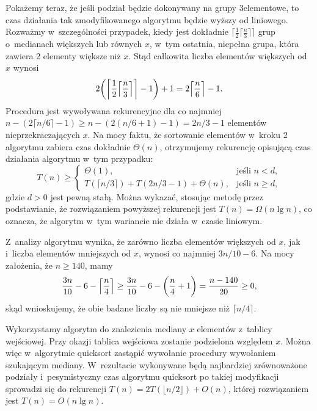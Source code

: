 Pokażemy teraz, że jeśli podział będzie dokonywany na grupy 3\nbhyphen elementowe, to czas działania tak zmodyfikowanego algorytmu  będzie wyższy od liniowego.
Rozważmy w~szczególności przypadek, kiedy jest dokładnie $\bigl\lceil\frac{1}{2}\bigl\lceil\frac{n}{3}\bigr\rceil\bigr\rceil$ grup o~medianach większych lub równych $x$, w~tym ostatnia, niepełna grupa, która zawiera 2 elementy większe niż $x$.
Stąd całkowita liczba elementów większych od $x$ wynosi
\[
	2\biggl(\biggl\lceil\frac{1}{2}\Bigl\lceil\frac{n}{3}\Bigr\rceil\biggr\rceil-1\biggr)+1 = 2\Bigl\lceil\frac{n}{6}\Bigr\rceil-1.
\]
Procedura jest wywoływana rekurencyjne dla co najmniej $n-(2\lceil n/6\rceil-1)\ge n-(2(n/6+1)-1)=2n/3-1$ elementów nieprzekraczających $x$.
Na mocy faktu, że sortowanie elementów w~kroku 2 algorytmu  zabiera czas dokładnie $\Theta(n)$, otrzymujemy rekurencję opisującą czas działania algorytmu w~tym przypadku:
\[
	T(n) \ge \begin{cases}
		\Theta(1), & \text{jeśli $n<d$}, \\
		T(\lceil n/3\rceil)+T(2n/3-1)+\Theta(n), & \text{jeśli $n\ge d$},
	\end{cases}
\]
gdzie $d>0$ jest pewną stałą.
Można wykazać, stosując metodę przez podstawianie, że rozwiązaniem powyższej rekurencji jest $T(n)=\Omega(n\lg n)$, co oznacza, że algorytm w~tym wariancie nie działa w~czasie liniowym.

\exercise %
Z~analizy algorytmu  wynika, że zarówno liczba elementów większych od $x$, jak i~liczba elementów mniejszych od $x$, wynosi co najmniej $3n/10-6$.
Na mocy założenia, że $n\ge140$, mamy
\[
	\frac{3n}{10}-6-\Bigl\lceil\frac{n}{4}\Bigr\rceil \ge \frac{3n}{10}-6-\biggl(\frac{n}{4}+1\biggr) = \frac{n-140}{20} \ge 0,
\]
skąd wnioskujemy, że obie badane liczby są nie mniejsze niż $\lceil n/4\rceil$.

\exercise %

\noindent Wykorzystamy algorytm  do znalezienia mediany $x$ elementów z~tablicy wejściowej.
Przy okazji tablica wejściowa zostanie podzielona względem $x$.
Można więc w~algorytmie quicksort zastąpić wywołanie procedury  wywołaniem  szukającym mediany.
W~rezultacie wykonywane będą najbardziej zrównoważone podziały i~pesymistyczny czas algorytmu quicksort po takiej modyfikacji sprowadzi się do rekurencji $T(n)=2T(\lfloor n/2\rfloor)+O(n)$, której rozwiązaniem jest $T(n)=O(n\lg n)$.

